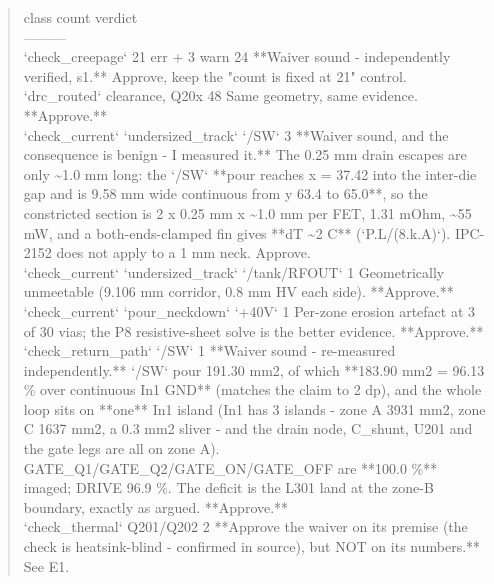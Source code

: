 \documentclass[11pt,a4paper]{article}
\begin{document}
\begin{quote}\small\ttfamily\raggedright
\textbar{} class \textbar{} count \textbar{} verdict \textbar{}\\
\textbar{}---\textbar{}---\textbar{}---\textbar{}\\
\textbar{} `check\_creepage` 21 err + 3 warn \textbar{} 24 \textbar{} {*}{*}Waiver sound - independently verified, s1.{*}{*} Approve, keep the "count is fixed at 21" control. \textbar{}\\
\textbar{} `drc\_routed` clearance, Q20x \textbar{} 48 \textbar{} Same geometry, same evidence. {*}{*}Approve.{*}{*} \textbar{}\\
\textbar{} `check\_current` `undersized\_track` `/SW` \textbar{} 3 \textbar{} {*}{*}Waiver sound, and the consequence is benign - I measured it.{*}{*} The 0.25 mm drain escapes are only \textasciitilde{}1.0 mm long: the `/SW` {*}{*}pour reaches x = 37.42 into the inter-die gap and is 9.58 mm wide continuous from y 63.4 to 65.0{*}{*}, so the constricted section is 2 x 0.25 mm x \textasciitilde{}1.0 mm per FET, 1.31 mOhm, \textasciitilde{}55 mW, and a both-ends-clamped fin gives {*}{*}dT \textasciitilde{}2 C{*}{*} (`P.L/(8.k.A)`). IPC-2152 does not apply to a 1 mm neck. Approve. \textbar{}\\
\textbar{} `check\_current` `undersized\_track` `/tank/RFOUT` \textbar{} 1 \textbar{} Geometrically unmeetable (9.106 mm corridor, 0.8 mm HV each side). {*}{*}Approve.{*}{*} \textbar{}\\
\textbar{} `check\_current` `pour\_neckdown` `+40V` \textbar{} 1 \textbar{} Per-zone erosion artefact at 3 of 30 vias; the P8 resistive-sheet solve is the better evidence. {*}{*}Approve.{*}{*} \textbar{}\\
\textbar{} `check\_return\_path` `/SW` \textbar{} 1 \textbar{} {*}{*}Waiver sound - re-measured independently.{*}{*} `/SW` pour 191.30 mm2, of which {*}{*}183.90 mm2 = 96.13 \% over continuous In1 GND{*}{*} (matches the claim to 2 dp), and the whole loop sits on {*}{*}one{*}{*} In1 island (In1 has 3 islands - zone A 3931 mm2, zone C 1637 mm2, a 0.3 mm2 sliver - and the drain node, C\_shunt, U201 and the gate legs are all on zone A). GATE\_Q1/GATE\_Q2/GATE\_ON/GATE\_OFF are {*}{*}100.0 \%{*}{*} imaged; DRIVE 96.9 \%. The deficit is the L301 land at the zone-B boundary, exactly as argued. {*}{*}Approve.{*}{*} \textbar{}\\
\textbar{} `check\_thermal` Q201/Q202 \textbar{} 2 \textbar{} {*}{*}Approve the waiver on its premise (the check is heatsink-blind - confirmed in source), but NOT on its numbers.{*}{*} See E1. \textbar{}\\

\end{quote}
\end{document}

